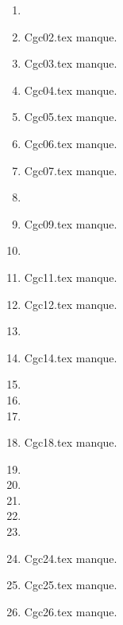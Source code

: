 \begin{enumerate}
  \item  
  \item Cgc02.tex manque. 
  \item Cgc03.tex manque. 
  \item Cgc04.tex manque. 
  \item Cgc05.tex manque. 
  \item Cgc06.tex manque. 
  \item Cgc07.tex manque. 
  \item  
  \item Cgc09.tex manque. 
  \item  
  \item Cgc11.tex manque. 
  \item Cgc12.tex manque. 
  \item  
  \item Cgc14.tex manque. 
  \item  
  \item  
  \item  
  \item Cgc18.tex manque. 
  \item  
  \item  
  \item  
  \item  
  \item  
  \item Cgc24.tex manque. 
  \item Cgc25.tex manque. 
  \item Cgc26.tex manque. 
\end{enumerate} 
